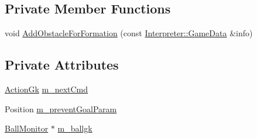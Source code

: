\subsection*{Private Member Functions}
\begin{DoxyCompactItemize}
\item 
void \hyperlink{classGoalkeeper_a5287a2e74795bbec8f0ead767655da5d}{AddObstacleForFormation} (const \hyperlink{structInterpreter_1_1GameData}{Interpreter::GameData} \&info)
\end{DoxyCompactItemize}
\subsection*{Private Attributes}
\begin{DoxyCompactItemize}
\item 
\hyperlink{classGoalkeeper_a25db0bed632b4bdb87532b0fbbf45855}{ActionGk} \hyperlink{classGoalkeeper_a84e9e9f514d0ace81c95e03ee832aea8}{m\_\-nextCmd}
\item 
Position \hyperlink{classGoalkeeper_a04b3ca2b51698e36928ccce7569842eb}{m\_\-preventGoalParam}
\item 
\hyperlink{classBallMonitor}{BallMonitor} $\ast$ \hyperlink{classGoalkeeper_a8fc8e75ffc8d3582d293b0fe42a0c073}{m\_\-ballgk}
\end{DoxyCompactItemize}


